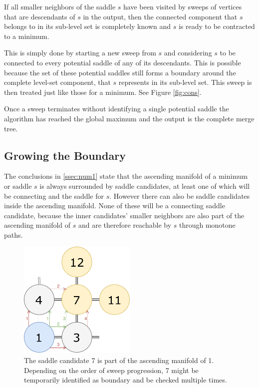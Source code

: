 \documentclass{scrartcl}
\begin{document}
If all smaller neighbors of the saddle \(s\) have been visited by sweeps of vertices that are descendants of \(s\) in the output, then the connected component that \(s\) belongs to in its sub-level set is completely known and \(s\) is ready to be contracted to a minimum. 

This is simply done by starting a new sweep from \(s\) and considering \(s\) to be connected to every potential saddle of any of its descendants. This is possible because the set of these potential saddles still forms a boundary around the complete level-set component, that \(s\) represents in its sub-level set. This sweep is then treated just like those for a minimum. See Figure \ref{fig:cons}.

Once a sweep terminates without identifying a single potential saddle the algorithm has reached the global maximum and the output is the complete merge tree.
 
\subsection{Growing the Boundary}
The conclusions in \ref{ssec:num1} state that the ascending manifold of a minimum or saddle \(s\) is always surrounded by saddle candidates, at least one of which will be connecting and the saddle for \(s\). However there can also be saddle candidates inside the ascending manifold. None of these will be a connecting saddle candidate, because the inner candidates' smaller neighbors are also part of the ascending manifold of \(s\) and are therefore reachable by \(s\) through monotone paths. 

\begin{figure}[h!]
\centering
\includegraphics[width=0.5\textwidth]{figures/MultiVisit.pdf}
\caption{The saddle candidate 7 is part of the ascending manifold of 1. Depending on the order of sweep progression, 7 might be temporarily identified as boundary and be checked multiple times.}
\label{fig:mv}
\end{figure}
\end{document}

